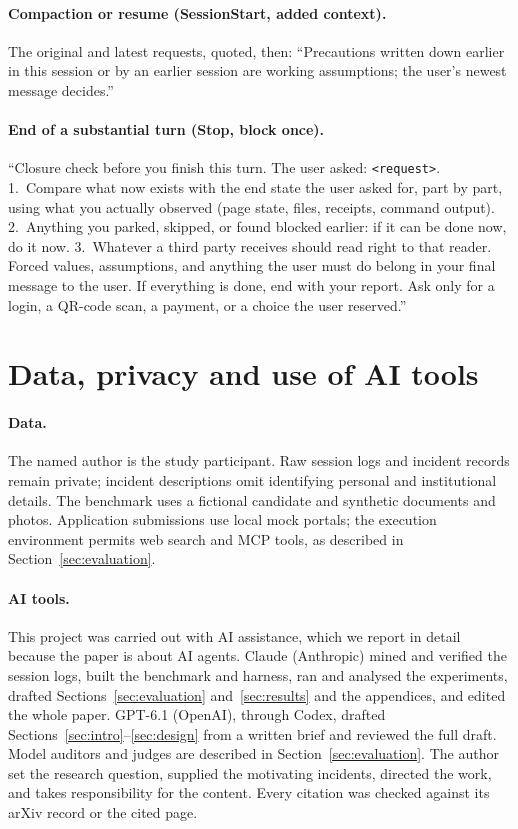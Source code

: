 {\paragraph{Compaction or resume (SessionStart, added context).} The original and latest requests, quoted, then: ``Precautions written down earlier in this session or by an earlier session are working assumptions; the user's newest message decides.''

\paragraph{End of a substantial turn (Stop, block once).} ``Closure check before you finish this turn. The user asked: \texttt{<request>}. 1.~Compare what now exists with the end state the user asked for, part by part, using what you actually observed (page state, files, receipts, command output). 2.~Anything you parked, skipped, or found blocked earlier: if it can be done now, do it now. 3.~Whatever a third party receives should read right to that reader. Forced values, assumptions, and anything the user must do belong in your final message to the user. If everything is done, end with your report. Ask only for a login, a QR-code scan, a payment, or a choice the user reserved.''
}

\section{Data, privacy and use of AI tools}
\label{app:statement}

\paragraph{Data.} The named author is the study participant. Raw session logs and incident records remain private; incident descriptions omit identifying personal and institutional details. The benchmark uses a fictional candidate and synthetic documents and photos. Application submissions use local mock portals; the execution environment permits web search and MCP tools, as described in Section~\ref{sec:evaluation}.

\paragraph{AI tools.} This project was carried out with AI assistance, which we report in detail because the paper is about AI agents. Claude (Anthropic) mined and verified the session logs, built the benchmark and harness, ran and analysed the experiments, drafted Sections~\ref{sec:evaluation} and~\ref{sec:results} and the appendices, and edited the whole paper. GPT-6.1 (OpenAI), through Codex, drafted Sections~\ref{sec:intro}--\ref{sec:design} from a written brief and reviewed the full draft. Model auditors and judges are described in Section~\ref{sec:evaluation}. The author set the research question, supplied the motivating incidents, directed the work, and takes responsibility for the content. Every citation was checked against its arXiv record or the cited page.
